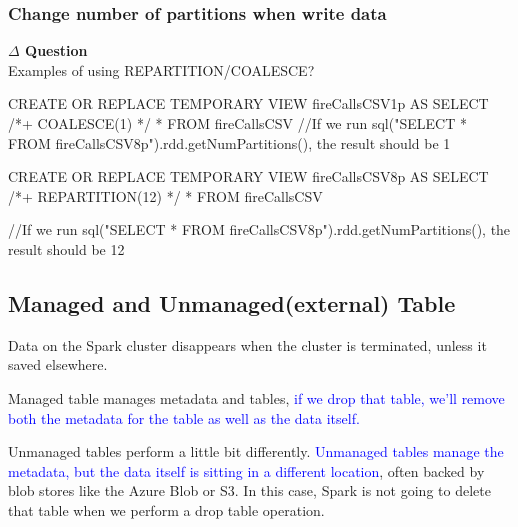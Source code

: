 \documentclass[12pt]{article}
\newenvironment{que}
    { \begin{mdframed}[backgroundcolor=green!20] \textbf{$\Delta$ Question} \\}
    {  \end{mdframed}}
\newcommand{\bluep}[1]{\textcolor{blue}{#1}}
\begin{document}
\subsubsection{Change number of partitions when write data}
\begin{table}[H]
\centering
{}
\caption{Controlling concurrency}
\label{tab:my-table}
\end{table}
\begin{que}
Examples of using REPARTITION/COALESCE?
\end{que}
\begin{code}
CREATE OR REPLACE TEMPORARY VIEW fireCallsCSV1p
  AS
SELECT /*+ COALESCE(1) */ * 
FROM fireCallsCSV
//If we run sql("SELECT * FROM fireCallsCSV8p").rdd.getNumPartitions(), the result should be 1

CREATE OR REPLACE TEMPORARY VIEW fireCallsCSV8p
  AS
SELECT /*+ REPARTITION(12) */ * 
FROM fireCallsCSV

//If we run sql("SELECT * FROM fireCallsCSV8p").rdd.getNumPartitions(), the result should be 12
\end{code}

\subsection{Managed and Unmanaged(external) Table}
Data on the Spark cluster
disappears when the cluster is terminated, unless it saved elsewhere.

Managed table manages metadata and tables, \bluep{if we drop that table, we'll remove both the metadata for the table as well as the data itself.}

Unmanaged tables perform a little bit differently.
\bluep{Unmanaged tables manage the metadata, but the data itself is sitting in a different location}, often backed by blob stores like the Azure Blob or S3. In this case, Spark is not going to delete that table when we perform a drop table operation.
\end{document}
